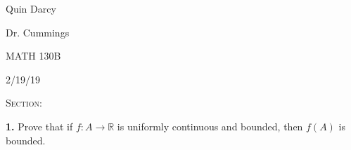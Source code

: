 \documentclass[12pt, a4paper]{article}
\begin{document}
  
\begin{flushleft}
  
    Quin Darcy\par
    Dr. Cummings\par
    MATH 130B\par
    2/19/19
  
\end{flushleft}
  
\centerline{}
 
\vspace{4mm}
 
\noindent\textsc{Section: }\par
 
\justifying
 
\vspace{1mm}
 
\hline
 
\vspace{6mm}

\noindent\textbf{1.} Prove that if $f\colon A\rightarrow\mathbb{R}$ is uniformly continuous and bounded, then $f(A)$ is bounded. 
\end{document}
